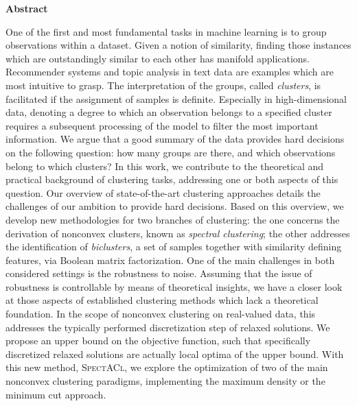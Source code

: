 \bigskip
\begin{center}
	\Large
    \textbf{Abstract}
\end{center}
One of the first and most fundamental tasks in machine learning is to group observations within a dataset. Given a notion of similarity, finding those instances which are outstandingly similar to each other has manifold applications. Recommender systems and topic analysis in text data are examples which are most intuitive to grasp. The interpretation of the groups, called \emph{clusters}, is facilitated if the assignment of samples is definite. Especially in high-dimensional data, denoting a degree to which an observation belongs to a specified cluster requires a subsequent processing of the model to filter the most important information. We argue that a good summary of the data provides hard decisions on the following question: how many groups are there, and which observations belong to which clusters? In this work, we contribute to the theoretical and practical background of clustering tasks, addressing one or both aspects of this question. Our overview of state-of-the-art clustering approaches details the challenges of our ambition to provide hard decisions. Based on this overview, we develop new methodologies for two branches of clustering: the one concerns the derivation of nonconvex clusters, known as \emph{spectral clustering}; the other addresses the identification of \emph{biclusters}, a set of samples together with similarity defining features, via Boolean matrix factorization. 
One of the main challenges in both considered settings is the robustness to noise. Assuming that the issue of robustness is controllable by means of theoretical insights, we have a closer look at those aspects of established clustering methods which lack a theoretical foundation. In the scope of nonconvex clustering on real-valued data, this addresses the typically performed discretization step of relaxed solutions. We propose an upper bound on the objective function, such that specifically discretized relaxed solutions are actually local optima of the upper bound. With this new method, \textsc{SpectACl}, we explore the optimization of two of the main nonconvex clustering paradigms, implementing the maximum density or the minimum cut approach. 
